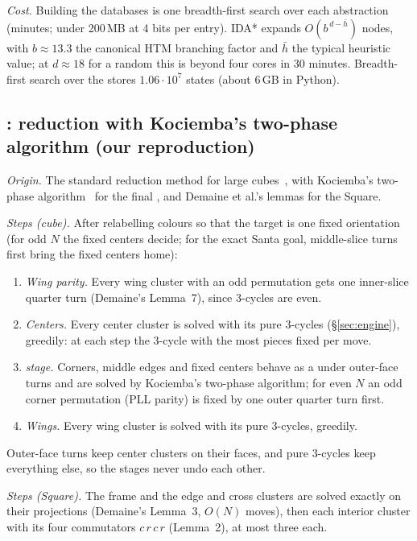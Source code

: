 \emph{Cost.} Building the  databases is one breadth-first search over each abstraction (minutes; under 200\,MB
at 4 bits per entry). IDA* expands $O(b^{\,d-\bar h})$ nodes, with $b\approx13.3$ the canonical HTM branching factor and
$\bar h$ the typical heuristic value; at $d\approx18$ for a random  this is beyond four cores in 30 minutes.
Breadth-first search over the  stores $1.06\cdot10^7$ states (about 6\,GB in Python).

\subsection{\Mtwo: reduction with Kociemba's two-phase algorithm (our reproduction)}
\label{sec:m2}

\emph{Origin.} The standard reduction method for large cubes~\cite{walton2017nxnxn}, with Kociemba's two-phase
algorithm~\cite{kociemba2phase} for the final , and Demaine et al.'s lemmas for the Square.

\emph{Steps (cube).} After relabelling colours so that the target is one fixed orientation (for odd $N$ the fixed
centers decide; for the exact Santa goal, middle-slice turns first bring the fixed centers home):
\begin{enumerate}
\item \emph{Wing parity.} Every wing cluster with an odd permutation gets one inner-slice quarter turn (Demaine's
  Lemma~7), since 3-cycles are even.
\item \emph{Centers.} Every center cluster is solved with its pure 3-cycles (\S\ref{sec:engine}), greedily: at each
  step the 3-cycle with the most pieces fixed per move.
\item \emph{ stage.} Corners, middle edges and fixed centers behave as a  under outer-face turns and are
  solved by Kociemba's two-phase algorithm; for even $N$ an odd corner permutation (PLL parity) is fixed by one outer
  quarter turn first.
\item \emph{Wings.} Every wing cluster is solved with its pure 3-cycles, greedily.
\end{enumerate}
Outer-face turns keep center clusters on their faces, and pure 3-cycles keep everything else, so the stages never
undo each other.

\emph{Steps (Square).} The frame and the edge and cross clusters are solved exactly on their projections (Demaine's
Lemma~3, $O(N)$ moves), then each interior cluster with its four commutators $c\,r\,c\,r$ (Lemma~2), at most three each.

